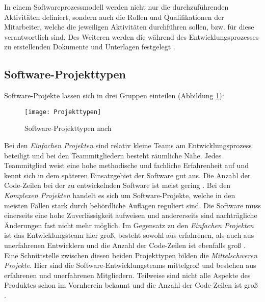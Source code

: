 In einem Softwareprozessmodell werden nicht nur die durchzuführenden Aktivitäten definiert, sondern auch die Rollen und Qualifikationen der Mitarbeiter, welche die jeweiligen Aktivitäten durchführen sollen, bzw. für diese verantwortlich sind. Des Weiteren werden die während des Entwicklungsprozesses zu erstellenden Dokumente und Unterlagen festgelegt \cite{Hanser2010}.

\subsection{Software-Projekttypen}

Software-Projekte lassen sich in drei Gruppen einteilen (Abbildung \ref{fig:Projekttypen}):

\begin{figure}[htp]
\begin{center}
  \texttt{[image: Projekttypen]} %
  \caption{Software-Projekttypen nach \cite{Boehm81}}
  \label{fig:Projekttypen}
\end{center}
\end{figure}

Bei den \textit{Einfachen Projekten} sind relativ kleine Teams am Entwicklungsprozess beteiligt und bei den Teammitgliedern besteht räumliche Nähe. Jedes Teammitglied weist eine hohe methodische und fachliche Erfahrenheit auf und kennt sich in dem späteren Einsatzgebiet der Software gut aus. Die Anzahl der Code-Zeilen bei der zu entwickelnden Software ist meist gering \cite{Boehm81, Hanser2010}. \newline
Bei den \textit{Komplexen Projekten} handelt es sich um Software-Projekte, welche in den meisten Fällen stark durch behördliche Auflagen reguliert sind. Die Software muss einerseits eine hohe Zuverlässigkeit aufweisen und andererseits sind nachträgliche Änderungen fast nicht mehr möglich. Im Gegensatz zu den \textit{Einfachen Projekten} ist das Entwicklungsteam hier groß, besteht sowohl aus erfahrenen, als auch aus unerfahrenen Entwicklern und die Anzahl der Code-Zeilen ist ebenfalls groß \cite{Boehm81, Hanser2010}. \newline
Eine Schnittstelle zwischen diesen beiden Projekttypen bilden die \textit{Mittelschweren Projekte}. Hier sind die Software-Entwicklungsteams mittelgroß und bestehen aus erfahrenen und unerfahrenen Mitgliedern. Teilweise sind nicht alle Aspekte des Produktes schon im Vornherein bekannt und die Anzahl der Code-Zeilen ist groß \cite{Boehm81, Hanser2010}.

